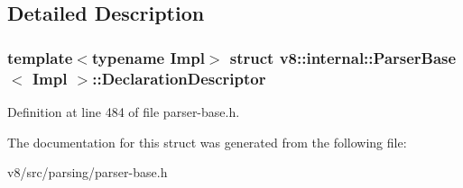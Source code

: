 \subsection{Detailed Description}
\subsubsection*{template$<$typename Impl$>$\newline
struct v8\+::internal\+::\+Parser\+Base$<$ Impl $>$\+::\+Declaration\+Descriptor}



Definition at line 484 of file parser-\/base.\+h.



The documentation for this struct was generated from the following file\+:\begin{DoxyCompactItemize}
\item 
v8/src/parsing/parser-\/base.\+h\end{DoxyCompactItemize}
